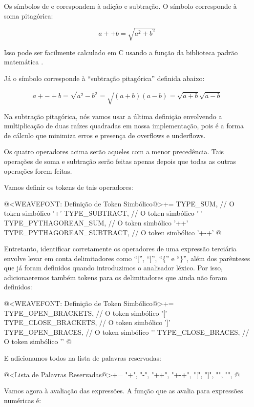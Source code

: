 Os símbolos de \monoespaco{+} e \monoespaco{-} corespondem à adição e
subtração. O símbolo \monoespaco{++} corresponde à soma pitagórica:

$$
a ++ b = \sqrt{a^2 + b^2}
$$

Isso pode ser facilmente calculado em C usando a função da biblioteca
padrão matemática .

Já o símbolo \monoespaco{+-+} corresponde à ``subtração pitagórica''
definida abaixo:

$$
a +-+ b = \sqrt{a^2 - b^2} = \sqrt{(a+b)(a-b)} = \sqrt{a+b}\sqrt{a-b}
$$

Na subtração pitagórica, nós vamos usar a última definição envolvendo
a multiplicação de duas raízes quadradas em nossa implementação, pois
é a forma de cálculo que minimiza erros e presença de overflows e
underflows.

Os quatro operadores acima serão aqueles com a menor precedência. Tais
operações de soma e subtração serão feitas apenas depois que todas as
outras operações forem feitas.

Vamos definir os tokens de tais operadores:

\iniciocodigo
@<WEAVEFONT: Definição de Token Simbólico@>+=
TYPE_SUM,                   // O token simbólico '+'
TYPE_SUBTRACT,              // O token simbólico '-'
TYPE_PYTHAGOREAN_SUM,       // O token simbólico '++'
TYPE_PYTHAGOREAN_SUBTRACT,  // O token simbólico '+-+'
@
\fimcodigo

Entretanto, identificar corretamente os operadores de uma expressão
terciária envolve levar em conta delimitadores como ``['', ``]'',
``$\{$'' e ``$\}$'', além dos parênteses que já foram definidos quando
introduzimos o analisador léxico. Por isso, adicionaeremos também
tokens para os delimitadores que ainda não foram definidos:

\iniciocodigo
@<WEAVEFONT: Definição de Token Simbólico@>+=
TYPE_OPEN_BRACKETS,         // O token simbólico '['
TYPE_CLOSE_BRACKETS,        // O token simbólico ']'
TYPE_OPEN_BRACES,           // O token simbólico '{'
TYPE_CLOSE_BRACES,          // O token simbólico '}'
@
\fimcodigo

E adicionamos todos na lista de palavras reservadas:

\iniciocodigo
@<Lista de Palavras Reservadas@>+=
"+", "-", "++", "+-+", "[", "]", "{", "}",
@
\fimcodigo

Vamos agora à avaliação das expressões. A função que as avalia para
expressões numéricas é:

